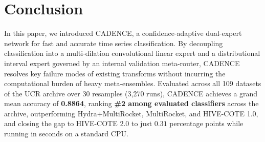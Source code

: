 \documentclass[journal,twocolumn]{article}
\begin{document}
\section{Conclusion}
In this paper, we introduced CADENCE, a confidence-adaptive dual-expert network for fast and accurate time series classification. By decoupling classification into a multi-dilation convolutional linear expert and a distributional interval expert governed by an internal validation meta-router, CADENCE resolves key failure modes of existing transforms without incurring the computational burden of heavy meta-ensembles. Evaluated across all 109 datasets of the UCR archive over 30 resamples (3,270 runs), CADENCE achieves a grand mean accuracy of \textbf{0.8864}, ranking \textbf{\#2 among evaluated classifiers} across the archive, outperforming Hydra+MultiRocket, MultiRocket, and HIVE-COTE 1.0, and closing the gap to HIVE-COTE 2.0 to just $0.31$ percentage points while running in seconds on a standard CPU.



\end{document}
